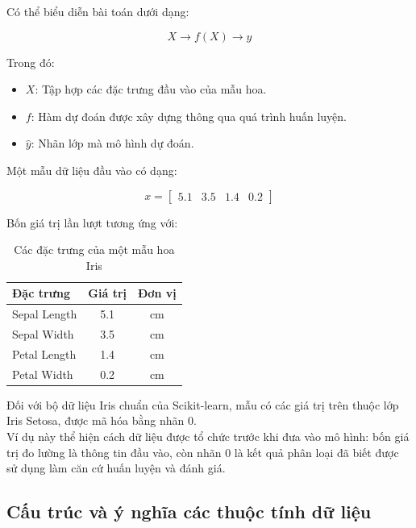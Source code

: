 \documentclass[14pt]{extarticle}
\begin{document}
		\noindent Có thể biểu diễn bài toán dưới dạng:
	
	\[
	X \longrightarrow f(X) \longrightarrow \hat{y}
	\]
	
	Trong đó:
	
	\begin{itemize}
		\item $X$: Tập hợp các đặc trưng đầu vào của mẫu hoa.
		\item $f$: Hàm dự đoán được xây dựng thông qua quá trình huấn luyện.
		\item $\hat{y}$: Nhãn lớp mà mô hình dự đoán.
	\end{itemize}
	
		\noindent Một mẫu dữ liệu đầu vào có dạng:
	
	\[
	x=
	\begin{bmatrix}
		5.1 & 3.5 & 1.4 & 0.2
	\end{bmatrix}
	\]
	
		\noindent Bốn giá trị lần lượt tương ứng với:
	
	\begin{table}[htbp]
		\centering
		\caption{Các đặc trưng của một mẫu hoa Iris}
		\label{tab:iris-sample}
		\begin{tabular}{|l|c|c|}
			\hline
			\textbf{Đặc trưng} & \textbf{Giá trị} & \textbf{Đơn vị} \\
			\hline
			Sepal Length & 5.1 & cm \\
			\hline
			Sepal Width & 3.5 & cm \\
			\hline
			Petal Length & 1.4 & cm \\
			\hline
			Petal Width & 0.2 & cm \\
			\hline
		\end{tabular}
	\end{table}
	
		\noindent Đối với bộ dữ liệu Iris chuẩn của Scikit-learn, mẫu có các giá trị trên thuộc lớp Iris Setosa, được mã hóa bằng nhãn 0.\\
	
		\noindent Ví dụ này thể hiện cách dữ liệu được tổ chức trước khi đưa vào mô hình: bốn giá trị đo lường là thông tin đầu vào, còn nhãn 0 là kết quả phân loại đã biết được sử dụng làm căn cứ huấn luyện và đánh giá.\\
	
	\subsection{Cấu trúc và ý nghĩa các thuộc tính dữ liệu}
	
\end{document}
